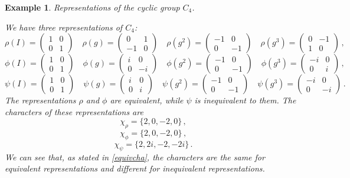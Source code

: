 \documentclass{article}
\theoremstyle{plain}\theoremheaderfont{\normalfont\itshape}\theorembodyfont{\rmfamily}\theoremseparator{.}\newtheorem*{rem}{Remark}\newtheorem*{ex}{Example}\newtheorem*{proof}{Proof}\newtheorem*{altp}{Alternative proof}
\theoremstyle{plain}\theoremheaderfont{\normalfont\bfseries}\theorembodyfont{\rmfamily}\theoremseparator{.}\newtheorem{thm}{Theorem}[section]\newtheorem{lem}[thm]{Lemma}\newtheorem{prop}[thm]{Proposition}\newtheorem*{cor}{Corollary}\newtheorem{defn}[thm]{Definition}\newtheorem{clm}[thm]{Claim}\newtheorem{clminproof}{Claim}
\theoremstyle{break}\theoremheaderfont{\normalfont\itshape}\theorembodyfont{\rmfamily}\theoremseparator{.\medskip}\newtheorem*{proofskip}{Proof}\newtheorem*{exs}{Examples}\newtheorem*{rems}{Remarks}
\theoremstyle{break}\theoremheaderfont{\normalfont\bfseries}\theorembodyfont{\rmfamily}\theoremseparator{.\medskip}\newtheorem{lemskip}[thm]{Lemma}\newtheorem{defnskip}[thm]{Definition}\newtheorem{propskip}[thm]{Proposition}\newtheorem{thmskip}[thm]{Theorem}
\numberwithin{equation}{section}
\begin{document}
	\begin{ex}
		\textit{Representations of the cyclic group \(C_4\).}

		We have three representations of \(C_4\):
		\[\rho(I)=\begin{pmatrix}
			1 & 0\\
			0 & 1
		\end{pmatrix}\quad\rho(g)=\begin{pmatrix}
			0 & 1\\
			-1 & 0
		\end{pmatrix}\quad\rho(g^2)=\begin{pmatrix}
			-1 & 0\\
			0 & -1
		\end{pmatrix}\quad\rho(g^3)=\begin{pmatrix}
			0 & -1\\
			1 & 0
		\end{pmatrix}\,,\]
		\[\phi(I)=\begin{pmatrix}
			1 & 0\\
			0 & 1
		\end{pmatrix}\quad\phi(g)=\begin{pmatrix}
			i & 0\\
			0 & -i
		\end{pmatrix}\quad\phi(g^2)=\begin{pmatrix}
			-1 & 0\\
			0 & -1
		\end{pmatrix}\quad\phi(g^3)=\begin{pmatrix}
			-i & 0\\
			0 & i
		\end{pmatrix}\,,\]
		\[\psi(I)=\begin{pmatrix}
			1 & 0\\
			0 & 1
		\end{pmatrix}\quad\psi(g)=\begin{pmatrix}
			i & 0\\
			0 & i
		\end{pmatrix}\quad\psi(g^2)=\begin{pmatrix}
			-1 & 0\\
			0 & -1
		\end{pmatrix}\quad\psi(g^3)=\begin{pmatrix}
			-i & 0\\
			0 & -i
		\end{pmatrix}\,.\]
		The representations \(\rho\) and \(\phi\) are equivalent, while \(\psi\) is inequivalent to them. The characters of these representations are
		\[\chi_\rho=\{2,0,-2,0\}\,,\]
		\[\chi_\phi=\{2,0,-2,0\}\,,\]
		\[\chi_\psi=\{2,2i,-2,-2i\}\,.\]
		We can see that, as stated in \cref{equivcha}, the characters are the same for equivalent representations and different for inequivalent representations.
	\end{ex}
\end{document}

